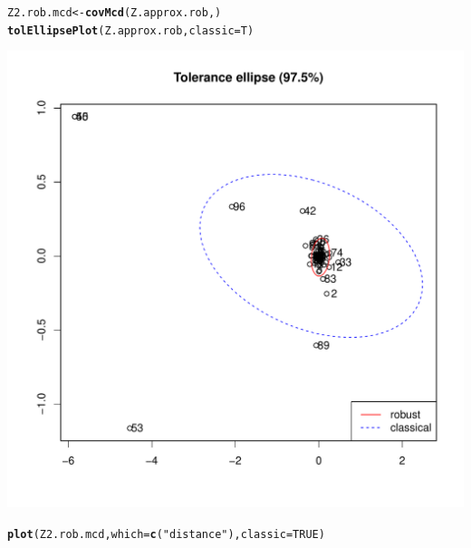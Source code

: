 \documentclass[a4paper,oneside,12pt,titlepage]{article}\usepackage[]{graphicx}\usepackage[]{color}
\makeatletter
\def\maxwidth{ %
  \ifdim\Gin@nat@width>\linewidth
    \linewidth
  \else
    \Gin@nat@width
  \fi
}
\newcommand{\hlnum}[1]{\textcolor[rgb]{0.686,0.059,0.569}{#1}}%
\newcommand{\hlstr}[1]{\textcolor[rgb]{0.192,0.494,0.8}{#1}}%
\newcommand{\hlstd}[1]{\textcolor[rgb]{0.345,0.345,0.345}{#1}}%
\newcommand{\hlkwb}[1]{\textcolor[rgb]{0.69,0.353,0.396}{#1}}%
\newcommand{\hlkwc}[1]{\textcolor[rgb]{0.333,0.667,0.333}{#1}}%
\newcommand{\hlkwd}[1]{\textcolor[rgb]{0.737,0.353,0.396}{\textbf{#1}}}%
\newenvironment{kframe}{%
 \def\at@end@of@kframe{}%
 \ifinner\ifhmode%
  \def\at@end@of@kframe{\end{minipage}}%
  \begin{minipage}{\columnwidth}%
 \fi\fi%
 \def\FrameCommand##1{\hskip\@totalleftmargin \hskip-\fboxsep
 \colorbox{shadecolor}{##1}\hskip-\fboxsep
     \hskip-\linewidth \hskip-\@totalleftmargin \hskip\columnwidth}%
 \MakeFramed {\advance\hsize-\width
   \@totalleftmargin\z@ \linewidth\hsize
   \@setminipage}}%
 {\par\unskip\endMakeFramed%
 \at@end@of@kframe}
\newenvironment{knitrout}{}{} %
\makeatother
\begin{document}
\begin{knitrout}
\color{fgcolor}\begin{kframe}
\begin{alltt}
\hlstd{Z2.rob.mcd} \hlkwb{<-} \hlkwd{covMcd}\hlstd{(Z.approx.rob,)}
\hlkwd{tolEllipsePlot}\hlstd{(Z.approx.rob,}\hlkwc{classic} \hlstd{= T)}
\end{alltt}
\end{kframe}
\includegraphics[width=\maxwidth]{figure/unnamed-chunk-11-1} 
\begin{kframe}\begin{alltt}
\hlkwd{plot}\hlstd{(Z2.rob.mcd,}\hlkwc{which} \hlstd{=} \hlkwd{c}\hlstd{(}\hlstr{"distance"}\hlstd{),}\hlkwc{classic} \hlstd{=} \hlnum{TRUE}\hlstd{)}
\end{alltt}
\end{kframe}

\end{knitrout}
\end{document}
